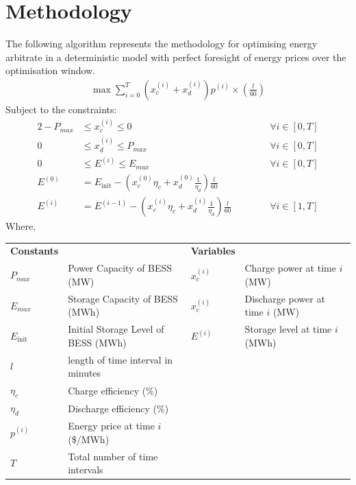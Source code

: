 \section{ Methodology }
The following algorithm represents the methodology for optimising energy arbitrate in a deterministic model with perfect foresight of energy prices over the optimisation window.
\begin{align*}
  \max \sum_{i=0}^T \left(x^{(i)}_c + x^{(i)}_d \right) p^{(i)} \times \left( \frac{l}{60} \right)
\end{align*}
Subject to the constraints:
\begin{alignat} {2}
    -P_{max} &\leq x^{(i)}_c \leq 0  &&\forall i \in [0,T]\\
    0 &\leq x^{(i)}_d \leq P_{max}  &&\forall i \in [0,T]\\
    0 &\leq E^{(i)} \leq E_{max} &&\forall i \in [0,T] \\
    E^{(0)} &= E_{\text{init}} - \left(x^{(0)}_c \eta_c + x^{(0)}_d \frac{1}{\eta_d} \right) \frac{l}{60} && \\
    E^{(i)} &= E^{(i-1)} - \left(x^{(i)}_c \eta_c + x^{(i)}_d \frac{1}{\eta_d} \right) \frac{l}{60} \hspace{1cm} &&\forall i \in [1,T] 
\end{alignat}
Where,
{\renewcommand{\arraystretch}{2}}
\begin{center}
    \begin{tabular}{p{0.8cm} p{5.5cm} p{0.8cm} p{5.5cm}}
    \textbf{Constants} & & \textbf{Variables} & \\
    $P_{max}$ & Power Capacity of BESS (MW) & $x^{(i)}_c$ & Charge power at time $i$ (MW)   \\ 
    $E_{max}$ & Storage Capacity of BESS (MWh) & $x^{(i)}_c$&  Discharge power at time $i$ (MW)  \\
    $E_{\text{init}}$ & Initial Storage Level of BESS (MWh)& $E^{(i)}$ &Storage level at time $i$ (MWh)\\
    $l$ & length of time interval in minutes & & \\
    $\eta_c$ & Charge efficiency (\%) & &\\
    $\eta_d$ & Discharge efficiency (\%) & &\\
    $p^{(i)}$ &  Energy price at time $i$ (\$/MWh) & &\\
    $T$ &  Total number of time intervals & &\\
    \end{tabular}
\end{center}
